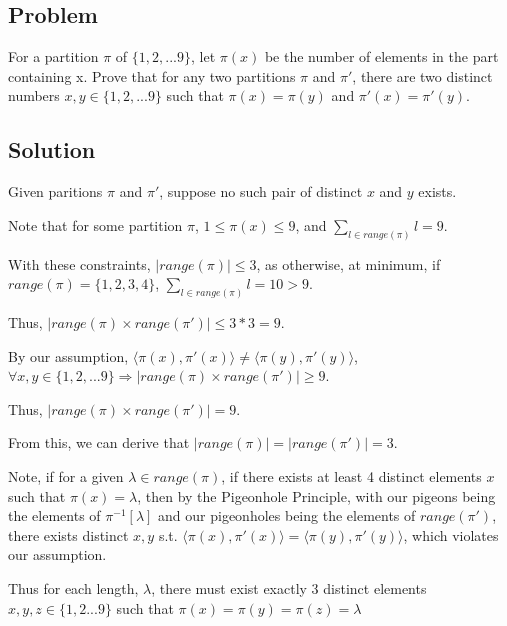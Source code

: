 \documentclass{article}
\newcommand{\pair}[1]{\langle #1 \rangle}
\begin{document}
\begin{center}\item\section*{Problem}\end{center}
For a partition $\pi$ of $\{1,2,...9\}$, let $\pi(x)$ be the number
of elements in the part containing x.
Prove that for any two partitions $\pi$ and $\pi'$, there are two distinct
numbers $x,y \in \{1,2,...9\}$ such that $\pi(x)=\pi(y)$ and
$\pi'(x)=\pi'(y)$.

\begin{center}\item\section*{Solution}\end{center}
Given paritions $\pi$ and $\pi'$, suppose no such pair of distinct $x$ and $y$ exists.

Note that for some partition $\pi$, $1 \leq \pi(x) \leq 9$, and 
$\displaystyle\sum_{l\in range(\pi)} l=9$.

With these constraints, $|range(\pi)|\leq 3$, as otherwise, at minimum, if 
$range(\pi)=\{1,2,3,4\}$, $\displaystyle\sum_{l\in range(\pi)} l=10 > 9$.

Thus, $|range(\pi) \times range(\pi')|\leq 3*3=9$.

By our assumption, $\pair{\pi(x),\pi'(x)} \not= \pair{\pi(y),\pi'(y)}$,
$\forall x,y \in \{1,2,...9\} \Rightarrow 
|range(\pi) \times range(\pi')|\geq 9$.

Thus, $|range(\pi)\times range(\pi')|=9$.

From this, we can derive that $|range(\pi)|=|range(\pi')|=3$.

Note, if for a given $\lambda \in range(\pi)$, if there exists at least 4
distinct elements $x$ such that $\pi(x)=\lambda$, then by the 
Pigeonhole Principle, with our pigeons being the elements of 
$\pi^{-1}[\lambda]$ and our pigeonholes being the elements of $range(\pi')$, there exists distinct $x,y$ s.t. 
$\pair{\pi(x),\pi'(x)}=\pair{\pi(y),\pi'(y)}$, which violates our assumption.

Thus for each length, $\lambda$, there must exist exactly 3 distinct
elements $x,y,z \in \{1,2...9\}$ such that $\pi(x)=\pi(y)=\pi(z)=\lambda$
\end{document}
